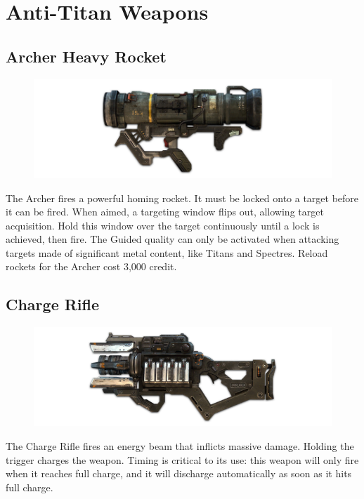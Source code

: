 \documentclass[9pt, openany]{extbook}
\begin{document}
\section{Anti-Titan Weapons}
\label{sec:antititanweapons}


\subsection{Archer Heavy Rocket}
\begin{figure}
\vspace*{-2em}
\includegraphics[width=\linewidth]{ArcherHeavyRocket}
\end{figure}

The Archer fires a powerful homing rocket. It must be locked onto a target before it can be fired. When aimed, a targeting window flips out, allowing target acquisition. Hold this window over the target continuously until a lock is achieved, then fire. The Guided quality can only be activated when attacking targets made of significant metal content, like Titans and Spectres. Reload rockets for the Archer cost 3,000 credit.

\subsection{Charge Rifle}
\begin{figure}
\vspace*{-2em}
\includegraphics[width=\linewidth]{ChargeRifle}
\end{figure}

The Charge Rifle fires an energy beam that inflicts massive damage. Holding the trigger charges the weapon. Timing is critical to its use: this weapon will only fire when it reaches full charge, and it will discharge automatically as soon as it hits full charge.
\end{document}
